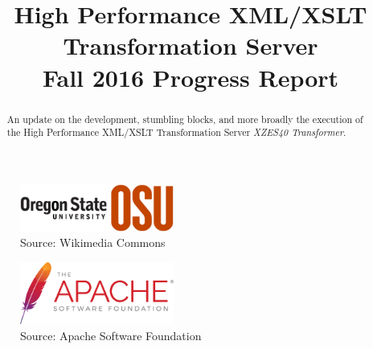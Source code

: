 

\title{
	High Performance XML/XSLT Transformation Server \\
    {
    	\LARGE Fall 2016 Progress Report 
    }
}
\author{
}



\maketitle
\begin{abstract}
  An update on the development, stumbling blocks, and more broadly the execution of the High Performance XML/XSLT Transformation Server \textit{XZES40 Transformer}.
\end{abstract}

\begin{figure}[h]
  \begin{centering}
    \includegraphics[width=0.45\textwidth]{figures/osu-logo}
    \caption{Source: Wikimedia Commons \cite{osu-logo}}
  \end{centering}
\end{figure}

\begin{figure}[h]
  \begin{centering}
    \includegraphics[width=0.45\textwidth]{figures/asf-logo}
    \caption{Source: Apache Software Foundation \cite{asf-logo}}
  \end{centering}
\end{figure}

\clearpage

